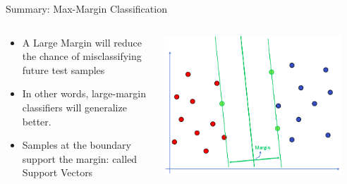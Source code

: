 \documentclass[aspectratio=169, 14pt]{beamer}
\begin{document}
\begin{frame}[t]{Summary: Max-Margin Classification​}
\begin{columns}
	\begin{column}{0.55\textwidth}
        \begin{itemize}
	\item A Large Margin will reduce the chance of misclassifying future test samples
	\item In other words, large-margin classifiers will generalize better.​
        \item Samples at the boundary support the margin: called Support Vectors
	\end{itemize}
	\end{column}
	\begin{column}{0.45\textwidth}
		\vskip-0.5cm
		\includegraphics[width=0.9\textwidth]{SVM_NonLinear_Images/AIML_SVM_IMG6.png}
        \end{column}
\end{columns}

\end{frame}
\end{document}
